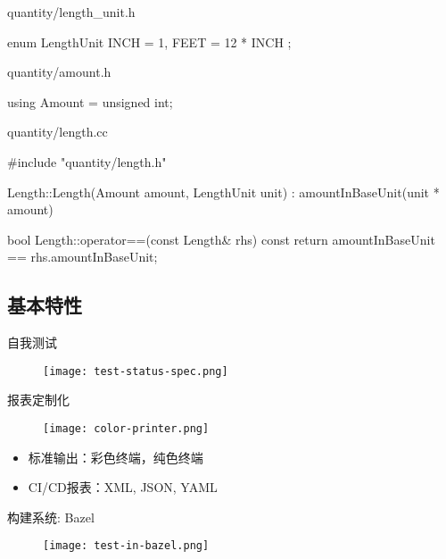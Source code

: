 \begin{frame}[fragile]{quantity/length\_unit.h}
\begin{c++}
enum LengthUnit {
  INCH = 1,
  FEET = 12 * INCH
};
\end{c++}
\end{frame}

\begin{frame}[fragile]{quantity/amount.h}
\begin{c++}
using Amount = unsigned int;
\end{c++}
\end{frame}

\begin{frame}[fragile]{quantity/length.cc}
\begin{c++}
#include "quantity/length.h"

Length::Length(Amount amount, LengthUnit unit)
  : amountInBaseUnit(unit * amount)
{
}

bool Length::operator==(const Length& rhs) const {
  return amountInBaseUnit == rhs.amountInBaseUnit;
}
\end{c++}
\end{frame}

\subsection{基本特性}

\begin{frame}{自我测试}
    \centering
    \begin{figure}
      \centering
      \texttt{[image: test-status-spec.png]}
    \end{figure}
\end{frame}

\begin{frame}{报表定制化}
    \centering
    \begin{figure}
      \centering
      \texttt{[image: color-printer.png]}
    \end{figure}

    \begin{itemize}
    \item \alert{标准输出}：彩色终端，纯色终端
    \item \alert{CI/CD报表}：XML, JSON, YAML
    \end{itemize}    
\end{frame}

\begin{frame}{构建系统: Bazel}
    \centering
    \begin{figure}
      \centering
      \texttt{[image: test-in-bazel.png]}
    \end{figure}
\end{frame}

